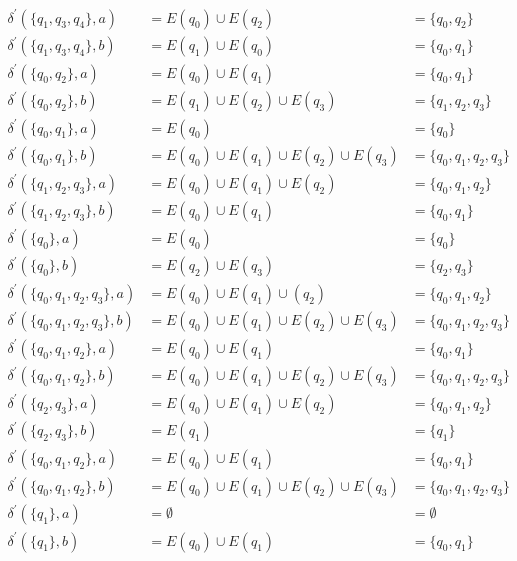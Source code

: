 \documentclass[12pt]{article}
\begin{document}
\begin{align*}
	\delta^{'} (\{q_1, q_3, q_4\}, a) & = E(q_0) \cup E(q_2) & = \{q_0, q_2\} \\
	\delta^{'} (\{q_1, q_3, q_4\}, b) & = E(q_1) \cup E(q_0) & = \{q_0, q_1\} \\
	\delta^{'} (\{q_0, q_2\}, a) & = E(q_0) \cup E(q_1) & = \{q_0, q_1\} \\
	\delta^{'} (\{q_0, q_2\}, b) & = E(q_1) \cup E(q_2) \cup E(q_3) & = \{q_1, q_2, q_3\} \\
	\delta^{'} (\{q_0, q_1\}, a) & = E(q_0) & = \{q_0\} \\
	\delta^{'} (\{q_0, q_1\}, b) & = E(q_0) \cup E(q_1) \cup E(q_2) \cup E(q_3) & = \{q_0, q_1, q_2, q_3\} \\
	\delta^{'} (\{q_1, q_2, q_3\}, a) & = E(q_0) \cup E(q_1) \cup E(q_2) & = \{q_0, q_1, q_2\} \\
	\delta^{'} (\{q_1, q_2, q_3\}, b) & = E(q_0) \cup E(q_1) & = \{q_0, q_1\} \\
	\delta^{'} (\{q_0\}, a) & = E(q_0) & = \{q_0\} \\
	\delta^{'} (\{q_0\}, b) & = E(q_2) \cup E(q_3) & = \{q_2, q_3\} \\
	\delta^{'} (\{q_0, q_1, q_2, q_3\}, a) & = E(q_0) \cup E(q_1) \cup (q_2) & = \{q_0, q_1, q_2\} \\
	\delta^{'} (\{q_0, q_1, q_2, q_3\}, b) & = E(q_0) \cup E(q_1) \cup E(q_2) \cup E(q_3) & = \{q_0, q_1, q_2, q_3\} \\
	\delta^{'} (\{q_0, q_1, q_2\}, a) & = E(q_0) \cup E(q_1) & = \{q_0, q_1\} \\
	\delta^{'} (\{q_0, q_1, q_2\}, b) & = E(q_0) \cup E(q_1) \cup E(q_2) \cup E(q_3) & = \{q_0, q_1, q_2, q_3\} \\
	\delta^{'} (\{q_2, q_3\}, a) & = E(q_0) \cup E(q_1) \cup E(q_2) & = \{q_0, q_1, q_2\} \\
	\delta^{'} (\{q_2, q_3\}, b) & = E(q_1) & = \{q_1\} \\
	\delta^{'} (\{q_0, q_1, q_2\}, a) & = E(q_0) \cup E(q_1) & = \{q_0, q_1\} \\
	\delta^{'} (\{q_0, q_1, q_2\}, b) & = E(q_0) \cup E(q_1) \cup E(q_2) \cup E(q_3) & = \{q_0, q_1, q_2, q_3\} \\
	\delta^{'} (\{q_1\}, a) & = \emptyset & = \emptyset \\
	\delta^{'} (\{q_1\}, b) & = E(q_0) \cup E(q_1) & = \{q_0, q_1\} \\
\end{align*}
\end{document}
